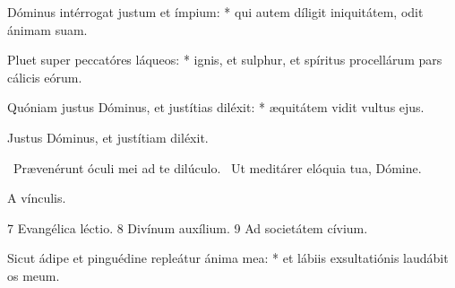 Dóminus intérrogat justum et ímpium: * qui autem díligit iniquitátem, odit ánimam suam.

Pluet super peccatóres láqueos: * ignis, et sulphur, et spíritus procellárum pars cálicis eórum.

Quóniam justus Dóminus, et justítias diléxit: * æquitátem vidit vultus ejus.

 Justus Dóminus, et justítiam diléxit.

\V\ Prævenérunt óculi mei ad te dilúculo. \R\ Ut meditárer elóquia tua, Dómine.

 A vínculis.

 7 Evangélica léctio. 8 Divínum auxílium. 9 Ad societátem cívium.

Sicut ádipe et pinguédine repleátur ánima mea: * et lábiis exsultatiónis laudábit os meum.

